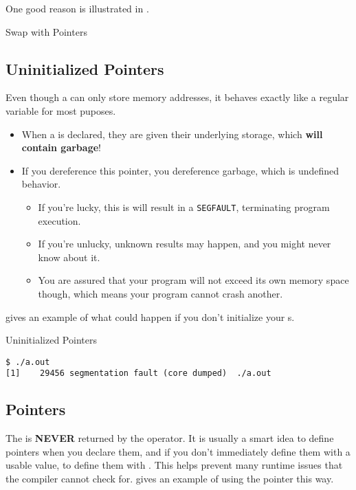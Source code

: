 One good reason is illustrated in .

\begin{listing}[h!tbp]
\caption{Swap with Pointers}
\label{lst:int_Pointer_Swap}
\end{listing}

\subsection{Uninitialized Pointers}\label{subsec:Uninitialized_Pointers}
Even though a  can only store memory addresses, it behaves exactly like a regular variable for most puposes.

\begin{itemize}
\item When a  is declared, they are given their underlying storage, which \textbf{will contain garbage}!
\item If you dereference this pointer, you dereference garbage, which is undefined behavior.
  \begin{itemize}
  \item If you're lucky, this is will result in a \texttt{SEGFAULT}, terminating program execution.
  \item If you're unlucky, unknown results may happen, and you might never know about it.
  \item You are assured that your program will not exceed its own memory space though, which means your program cannot crash another.
  \end{itemize}
\end{itemize}

 gives an example of what could happen if you don't initialize your s.
\begin{listing}[h!tbp]
\caption{Uninitialized Pointers}
\label{lst:Uninitialized_Pointer}

\begin{verbatim}
$ ./a.out
[1]    29456 segmentation fault (core dumped)  ./a.out
\end{verbatim}
\end{listing}

\subsection{\texorpdfstring{}{\texttt{NULL}} Pointers}\label{subsec:NULL_Pointers}
The   is \textbf{NEVER} returned by the \cinline{&} operator.
It is usually a smart idea to define pointers when you declare them, and if you don't immediately define them with a usable value, to define them with .
This helps prevent many runtime issues that the compiler cannot check for.
 gives an example of using the  pointer this way.

